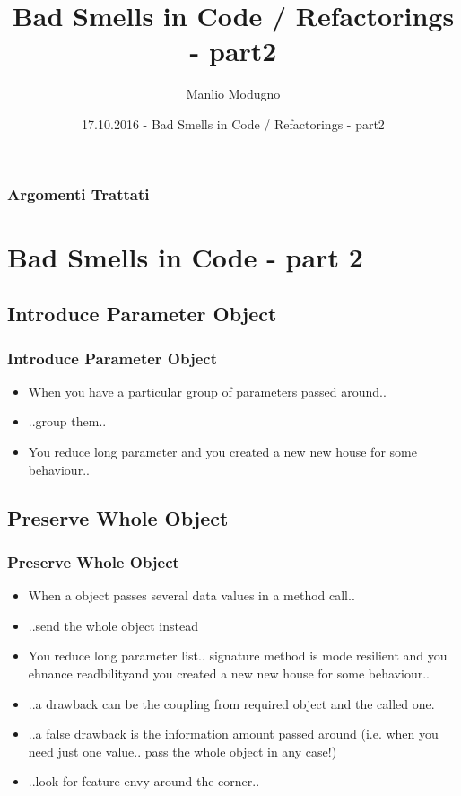 \documentclass{beamer}
\title{Bad Smells in Code / Refactorings - part2}
\author{Manlio Modugno}
\institute[GMTechnologies]
\date[17.10.2016] 
{17.10.2016 - Bad Smells in Code / Refactorings - part2}
\begin{document}
\begin{frame}
  \titlepage
\end{frame}

\begin{frame}
  \frametitle{Argomenti Trattati}
  \tableofcontents
\end{frame}

\section{Bad Smells in Code - part 2}
\subsection{Introduce Parameter Object}
\begin{frame}
  \frametitle{Introduce Parameter Object}
  \begin{itemize}
	\item<+-> When you have a particular group of parameters passed around..
	\item<+-> ..group them..
	\item<+-> You reduce long parameter and you created a new new house for some behaviour..
  \end{itemize}
\end{frame}


\subsection{Preserve Whole Object}
\begin{frame}
  \frametitle{Preserve Whole Object}
  \begin{itemize}
	\item<+-> When a object passes several data values in a method call..
	\item<+-> ..send the whole object instead
	\item<+-> You reduce long parameter list.. signature method is mode resilient and you ehnance readbilityand you created a new new house for some behaviour..
	\item<+-> ..a drawback can be the coupling from required object and the called one.
	\item<+-> ..a false drawback is the information amount passed around (i.e. when you need just one value.. pass the whole object in any case!)
	\item<+-> ..look for feature envy around the corner..
  \end{itemize}
\end{frame}
\end{document}
